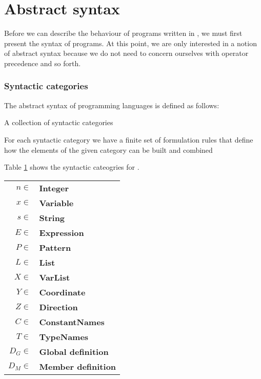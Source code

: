 \section{Abstract syntax}
Before we can describe the behaviour of programs written in
\productname{}, we must first present the syntax of programs. At this point, we 
are only interested in a notion of abstract syntax because we do not need to
concern ourselves with operator precedence and so forth.

\subsubsection{Syntactic categories}
The abstract syntax of programming languages is defined as
follows\cite[p. 27]{tt-hh}:

\begin{dlist}
  \item A collection of syntactic categories
  \item For each syntactic category we have a finite set of formulation rules
    that define how the elements of the given category can be built and
    combined
\end{dlist}

Table \ref{table:syn-cat} shows the syntactic cateogries for
\productname{}.

\begin{table}[ht]
  \begin{center}
    \begin{tabular}{rl}
      \hline
      $n \in$ & \textbf{Integer}       \\
      $x \in$ & \textbf{Variable}      \\
      $s \in$ & \textbf{String}        \\
      $E \in$ & \textbf{Expression}    \\
      $P \in$ & \textbf{Pattern}       \\
      $L \in$ & \textbf{List}          \\
      $X \in$ & \textbf{VarList}       \\
      $Y \in$ & \textbf{Coordinate}    \\
      $Z \in$ & \textbf{Direction}     \\
      $C \in$ & \textbf{ConstantNames}      \\
      $T \in$ & \textbf{TypeNames}          \\
      $D_{G} \in$ & \textbf{Global definition}   \\
      $D_{M} \in$ & \textbf{Member definition}   \\
      \hline
    \end{tabular}  
    \label{table:syn-cat}
  \end{center}
\end{table}

